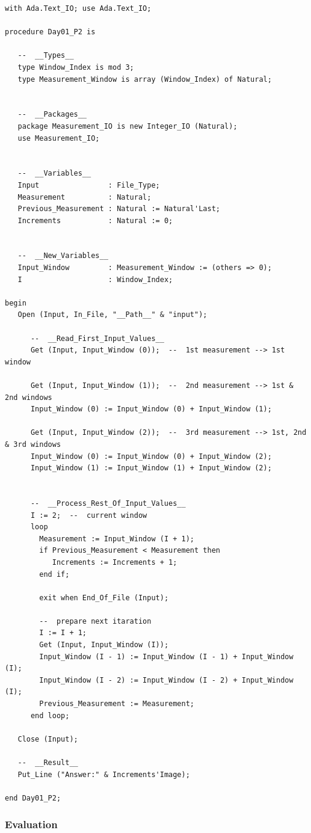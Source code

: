 \documentclass[11pt]{article}
\begin{document}
\begin{verbatim}
with Ada.Text_IO; use Ada.Text_IO;

procedure Day01_P2 is

   --  __Types__
   type Window_Index is mod 3;
   type Measurement_Window is array (Window_Index) of Natural;


   --  __Packages__
   package Measurement_IO is new Integer_IO (Natural);
   use Measurement_IO;


   --  __Variables__
   Input                : File_Type;
   Measurement          : Natural;
   Previous_Measurement : Natural := Natural'Last;
   Increments           : Natural := 0;


   --  __New_Variables__
   Input_Window         : Measurement_Window := (others => 0);
   I                    : Window_Index;

begin
   Open (Input, In_File, "__Path__" & "input");

      --  __Read_First_Input_Values__
      Get (Input, Input_Window (0));  --  1st measurement --> 1st window

      Get (Input, Input_Window (1));  --  2nd measurement --> 1st & 2nd windows
      Input_Window (0) := Input_Window (0) + Input_Window (1);

      Get (Input, Input_Window (2));  --  3rd measurement --> 1st, 2nd & 3rd windows
      Input_Window (0) := Input_Window (0) + Input_Window (2);
      Input_Window (1) := Input_Window (1) + Input_Window (2);


      --  __Process_Rest_Of_Input_Values__
      I := 2;  --  current window
      loop
        Measurement := Input_Window (I + 1);
        if Previous_Measurement < Measurement then
           Increments := Increments + 1;
        end if;

        exit when End_Of_File (Input);

        --  prepare next itaration
        I := I + 1;
        Get (Input, Input_Window (I));
        Input_Window (I - 1) := Input_Window (I - 1) + Input_Window (I);
        Input_Window (I - 2) := Input_Window (I - 2) + Input_Window (I);
        Previous_Measurement := Measurement;
      end loop;

   Close (Input);

   --  __Result__
   Put_Line ("Answer:" & Increments'Image);

end Day01_P2;
\end{verbatim}

\subsubsection{Evaluation}
\label{sec:org4c13111}
\end{document}
